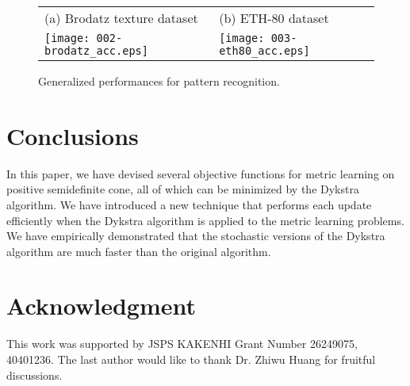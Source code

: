 \documentclass[10pt,onecolumn]{article}
\theoremstyle{definition}
\theoremstyle{definition}
\theoremstyle{definition}
\theoremstyle{definition}
\theoremstyle{definition}
\theoremstyle{theorem}
\newcommand{\0}{{\bm{0}}}
\newcommand{\1}{{\bm{1}}}
\begin{document}
\begin{figure*}[t!]
\begin{center}
  \begin{tabular}{ll}
    (a) Brodatz texture dataset
    & (b) ETH-80  dataset
    \\
    \texttt{[image: 002-brodatz\_acc.eps]}
    &
    \texttt{[image: 003-eth80\_acc.eps]}
\end{tabular}
\end{center}
\caption{Generalized performances for pattern recognition. \label{fig:accbars}}
\end{figure*}

\section{Conclusions}
%
In this paper, we have devised several objective functions
for metric learning on positive semidefinite cone, all of
which can be minimized by the Dykstra algorithm. We have
introduced a new technique that performs each update
efficiently when the Dykstra algorithm is applied to the
metric learning problems. We have empirically demonstrated
that the stochastic versions of the Dykstra algorithm are
much faster than the original algorithm.


\section*{Acknowledgment}
%
This work was supported by JSPS KAKENHI Grant Number
26249075, 40401236. 
The last author would like to thank Dr. Zhiwu Huang for fruitful discussions.
 
\end{document}
